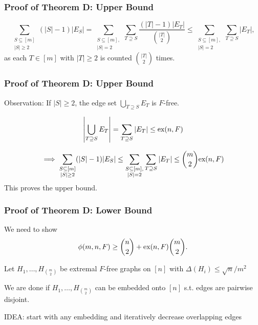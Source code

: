 \documentclass{beamer}
\newcommand*{\ex}{\textnormal{ex}}
\begin{document}
\begin{frame}

  \frametitle{Proof of Theorem D: Upper Bound}

  \[
    \sum_{\substack{S \subseteq [m] \\ |S| \geq 2}} (|S| - 1)|E_S| = \sum_{\substack{S \subseteq [m], \\ |S| = 2}} \sum_{T \supseteq S} \frac{(|T| - 1)|E_T|}{\binom{|T|}{2}} \leq \sum_{\substack{S \subseteq [m], \\ |S| = 2}} \sum_{T \supseteq S} |E_T|,
  \]
  as each $T \in [m]$ with $|T| \geq 2$ is counted $\binom{|T|}{2}$ times.
\end{frame}

\begin{frame}
  \frametitle{Proof of Theorem D: Upper Bound}

  Observation: If $|S| \geq 2$, the edge set $\bigcup_{T \supseteq S} E_T$ is $F$-free.

  \pause

  \vspace{0.3cm}

  \[
    \left|\bigcup_{T \supseteq S} E_T\right| = \sum_{T \supseteq S} |E_T| \leq \ex(n, F)
  \]
  \pause

  \vspace{0.3cm}

  \[
    \implies \sum_{\substack{S \subseteq [m] \\ |S| \geq 2}} (|S| - 1)|E_S| \leq \sum_{\substack{S \subseteq [m], \\ |S| = 2}} \sum_{T \supseteq S} |E_T| \leq \binom{m}{2}\ex(n, F)
  \]
  This proves the upper bound.
\end{frame}

\begin{frame}
  \frametitle{Proof of Theorem D: Lower Bound}

  We need to show
  \[  
    \phi(m, n ,F) \geq \binom{n}{2} + \ex(n, F)\binom{m}{2}.  
  \]

  \pause
  \vspace{0.3cm}

  Let $H_1, \ldots, H_{\binom{m}{2}}$ be extremal $F$-free graphs on $[n]$ with $\Delta(H_i) \leq \sqrt{n}/m^2$

  \pause

  \vspace{0.5cm}

  We are done if $H_1, \ldots, H_{\binom{m}{2}}$ can be embedded onto $[n]$ s.t. edges are pairwise disjoint.

  \pause

  \vspace{0.5cm}

  IDEA: start with any embedding and iteratively decrease overlapping edges
\end{frame}
\end{document}
